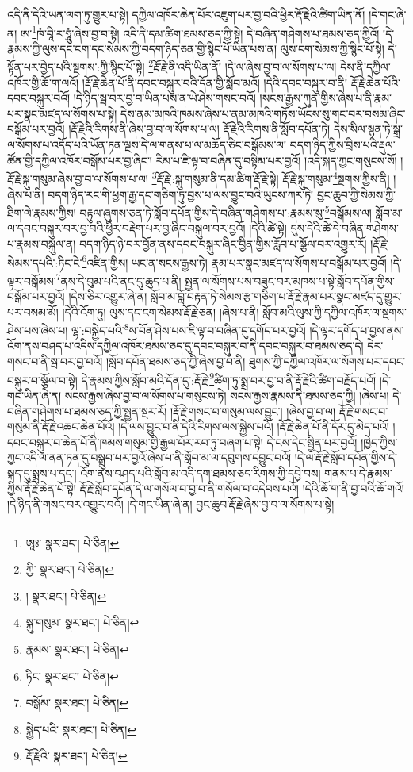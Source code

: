 འདི་ནི་དེའི་ཡན་ལག་ཏུ་གྱུར་པ་སྟེ། དཀྱིལ་འཁོར་ཆེན་པོར་འཇུག་པར་བྱ་བའི་ཕྱིར་རྡོ་རྗེའི་ཚིག་ཡིན་ནོ། །དེ་གང་ཞེ་ན། ཨ་\footnote{ཨཱཿ་  སྣར་ཐང་།  པེ་ཅིན། }ཁཾ་བཱི་ར་ཧཱུཾ་ཞེས་བྱ་བ་སྟེ། འདི་ནི་དམ་ཚིག་ཐམས་ཅད་ཀྱི་སྟེ། དེ་བཞིན་གཤེགས་པ་ཐམས་ཅད་ཀྱིའོ། །དེ་རྣམས་ཀྱི་ལུས་དང་ངག་དང་སེམས་ཀྱི་བདག་ཉིད་ཅན་གྱི་སྙིང་པོ་ཡིན་པས་ན། ལུས་ངག་སེམས་ཀྱི་སྙིང་པོ་སྟེ། དེ་སྟོན་པར་བྱེད་པའི་སྔགས་:ཀྱི་སྙིང་པོ་སྟེ། \footnote{ཀྱི་  སྣར་ཐང་།  པེ་ཅིན། }རྡོ་རྗེ་ནི་འདི་ཡིན་ནོ། །དེ་ལ་ཞེས་བྱ་བ་ལ་སོགས་པ་ལ། དེས་ནི་དཀྱིལ་འཁོར་གྱི་ཆོ་ག་ལའོ། །རྡོ་རྗེ་ཆེན་པོ་ནི་དབང་བསྐུར་བའི་དོན་གྱི་སློབ་མའོ། །དེའི་དབང་བསྐུར་བ་ནི། རྡོ་རྗེ་ཆེན་པོའི་དབང་བསྐུར་བའོ། །དེ་ཉིད་སྦ་བར་བྱ་བ་ཡིན་པས་ན་ཡེ་ཤེས་གསང་བའོ། །སངས་རྒྱས་ཀུན་གྱིས་ཞེས་པ་ནི་རྣམ་པར་སྣང་མཛད་ལ་སོགས་པ་སྟེ། དེས་ནམ་མཁའི་ཁམས་ཞེས་པ་ནམ་མཁའི་གཏོས་ཡོངས་སུ་གང་བར་བསམ་ཞིང་བསྒོམ་པར་བྱའོ། །རྡོ་རྗེའི་རིགས་ནི་ཞེས་བྱ་བ་ལ་སོགས་པ་ལ། རྡོ་རྗེའི་རིགས་ནི་སློབ་དཔོན་ཏེ། དེས་སིལ་སྙན་ཏེ་སྒྲ་ལ་སོགས་པ་འདོད་པའི་ཡོན་ཏན་ལྔས་དེ་ལ་གནས་པ་ལ་མཆོད་ཅིང་བསྒོམས་ལ། བདག་ཉིད་ཀྱིས་བྲིས་པའི་རྡུལ་ཚོན་གྱི་དཀྱིལ་འཁོར་བསྒོམ་པར་བྱ་ཞིང་། རིམ་པ་ཇི་ལྟ་བ་བཞིན་དུ་བསྟིམ་པར་བྱའོ། །འདི་སྐད་ཀྱང་གསུངས་སོ། །རྡོ་རྗེ་སྐུ་གསུམ་ཞེས་བྱ་བ་ལ་སོགས་པ་ལ། \footnote{།    སྣར་ཐང་།  པེ་ཅིན། }རྡོ་རྗེ་:སྐུ་གསུམ་ནི་དམ་ཚིག་རྡོ་རྗེ་སྟེ། རྡོ་རྗེ་སྐུ་གསུམ་\footnote{སྐུ་གསུམ་  སྣར་ཐང་།  པེ་ཅིན། }སྔགས་ཀྱིས་ནི། །ཞེས་པ་ནི། བདག་ཉིད་རང་གི་ཕྱག་རྒྱ་དང་གཅིག་ཏུ་བྱས་པ་ལས་བྱུང་བའི་ཡུངས་ཀར་ཏེ། བྱང་ཆུབ་ཀྱི་སེམས་ཀྱི་ཐིག་ལེ་རྣམས་ཀྱིས། བརྟུལ་ཞུགས་ཅན་ཏེ་སློབ་དཔོན་གྱིས་དེ་བཞིན་གཤེགས་པ་:རྣམས་སུ་\footnote{རྣམས་  སྣར་ཐང་།  པེ་ཅིན། }བསྒོམས་ལ། སློབ་མ་ལ་དབང་བསྐུར་བར་བྱ་བའི་ཕྱིར་བརྡེག་པར་བྱ་ཞིང་བསྐུལ་བར་བྱའོ། །དེའི་ཚེ་སྟེ། དུས་དེའི་ཚེ་དེ་བཞིན་གཤེགས་པ་རྣམས་བསྐུལ་ན། བདག་ཉིད་ཉེ་བར་བྱོན་ནས་དབང་བསྐུར་ཞིང་བྱིན་གྱིས་རློབ་པ་སྩོལ་བར་འགྱུར་རོ། །རྡོ་རྗེ་སེམས་དཔའི་:ཏིང་ངེ་\footnote{ཏིང་  སྣར་ཐང་།  པེ་ཅིན། }འཛིན་གྱིས། ཡང་ན་སངས་རྒྱས་ཏེ། རྣམ་པར་སྣང་མཛད་ལ་སོགས་པ་བསྒོམ་པར་བྱའོ། །དེ་ལྟར་བསྒོམས་\footnote{བསྒོམ་  སྣར་ཐང་།  པེ་ཅིན། }ནས་དེ་བུམ་པའི་ནང་དུ་ཆུད་པ་ནི། སྤྱན་ལ་སོགས་པས་བཟུང་བར་མཁས་པ་སྟེ་སློབ་དཔོན་གྱིས་བསྒོམ་པར་བྱའོ། །དེས་ཅིར་འགྱུར་ཞེ་ན། སློབ་མ་བློ་བརྟན་ཏེ་སེམས་རྩ་གཅིག་པ་རྡོ་རྗེ་རྣམ་པར་སྣང་མཛད་དུ་གྱུར་པར་བསམ་མོ། །དེའི་འོག་ཏུ། ལུས་དང་ངག་སེམས་རྡོ་རྗེ་ཅན། །ཞེས་པ་ནི། སློབ་མའི་ལུས་ཀྱི་དཀྱིལ་འཁོར་ལ་སྔགས་ཤེས་པས་ཞེས་པ། ལྷ་:བསྐྱེད་པའི་\footnote{སྐྱེད་པའི་  སྣར་ཐང་།  པེ་ཅིན། }ས་བོན་ཤེས་པས་ཇི་ལྟ་བ་བཞིན་དུ་དགོད་པར་བྱའོ། །དེ་ལྟར་དགོད་པ་བྱས་ནས་འོག་ནས་བཤད་པ་འདིས་དཀྱིལ་འཁོར་ཐམས་ཅད་དུ་དབང་བསྐུར་བ་ནི་དབང་བསྐུར་བ་ཐམས་ཅད་དེ། དེར་གསང་བ་ནི་སྦ་བར་བྱ་བའོ། །སློབ་དཔོན་ཐམས་ཅད་ཀྱི་ཞེས་བྱ་བ་ནི། ཐུགས་ཀྱི་དཀྱིལ་འཁོར་ལ་སོགས་པར་དབང་བསྐུར་བ་སྩོལ་བ་སྟེ། དེ་རྣམས་ཀྱིས་སློབ་མའི་དོན་དུ་:རྡོ་རྗེ་\footnote{རྡོ་རྗེའི་  སྣར་ཐང་།  པེ་ཅིན། }ཚིག་ཏུ་སྨྲ་བར་བྱ་བ་ནི་རྡོ་རྗེའི་ཚིག་བརྗོད་པའོ། །དེ་གང་ཡིན་ཞེ་ན། སངས་རྒྱས་ཞེས་བྱ་བ་ལ་སོགས་པ་གསུངས་ཏེ། སངས་རྒྱས་རྣམས་ནི་ཐམས་ཅད་ཀྱི། །ཞེས་པ། དེ་བཞིན་གཤེགས་པ་ཐམས་ཅད་ཀྱི་སྤྱན་སྔར་རོ། །རྡོ་རྗེ་གསང་བ་གསུམ་ལས་བྱུང་། །ཞེས་བྱ་བ་ལ། རྡོ་རྗེ་གསང་བ་གསུམ་ནི་རྡོ་རྗེ་འཆང་ཆེན་པོའོ། །དེ་ལས་བྱུང་བ་ནི་དེའི་རིགས་ལས་སྐྱེས་པའོ། །རྡོ་རྗེ་ཆེན་པོ་ནི་དོར་དུ་མེད་པའོ། །དབང་བསྐུར་བ་ཆེན་པོ་ནི་ཁམས་གསུམ་གྱི་རྒྱལ་པོར་རབ་ཏུ་བཞག་པ་སྟེ། དེ་ངས་དེང་སྦྱིན་པར་བྱའོ། །ཁྱེད་ཀྱིས་ཀྱང་འདི་ལ་ནན་ཏན་དུ་བསྒྲུབ་པར་བྱའོ་ཞེས་པ་ནི་སློབ་མ་ལ་དབུགས་དབྱུང་བའོ། །དེ་ལ་རྡོ་རྗེ་སློབ་དཔོན་གྱིས་དེ་སྐད་དུ་སྨྲས་པ་དང་། འོག་ནས་བཤད་པའི་སློབ་མ་འདི་དག་ཐམས་ཅད་རིགས་ཀྱི་དབྱེ་བས། གནས་པ་དེ་རྣམས་ཀྱིས་རྡོ་རྗེ་ཆེན་པོ་སྟེ། རྡོ་རྗེ་སློབ་དཔོན་དེ་ལ་གསོལ་བ་བྱ་བ་ནི་གསོལ་བ་འདེབས་པའོ། །དེའི་ཆོ་ག་ནི་བྱ་བའི་ཆོ་གའོ། །དེ་ཉིད་ནི་གསང་བར་འགྱུར་བའོ། །དེ་གང་ཡིན་ཞེ་ན། བྱང་ཆུབ་རྡོ་རྗེ་ཞེས་བྱ་བ་ལ་སོགས་པ་སྟེ། 